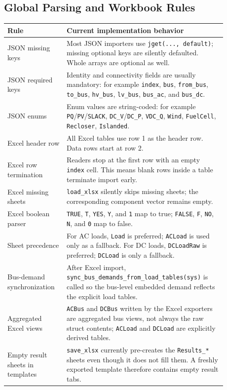 \subsection{Global Parsing and Workbook Rules}

\begin{longtable}{L{0.22\linewidth}L{0.66\linewidth}}
\toprule
Rule & Current implementation behavior \\
\midrule
\endhead
JSON missing keys & Most JSON importers use \texttt{jget(..., default)}; missing optional keys are silently defaulted.  Whole arrays are optional as well. \\
JSON required keys & Identity and connectivity fields are usually mandatory: for example \texttt{index}, \texttt{bus}, \texttt{from\_bus}, \texttt{to\_bus}, \texttt{hv\_bus}, \texttt{lv\_bus}, \texttt{bus\_ac}, and \texttt{bus\_dc}. \\
JSON enums & Enum values are string-coded: for example \texttt{PQ}/\texttt{PV}/\texttt{SLACK}, \texttt{DC\_V}/\texttt{DC\_P}, \texttt{VDC\_Q}, \texttt{Wind}, \texttt{FuelCell}, \texttt{Recloser}, \texttt{Islanded}. \\
Excel header row & All Excel tables use row 1 as the header row.  Data rows start at row 2. \\
Excel row termination & Readers stop at the first row with an empty \texttt{index} cell.  This means blank rows inside a table terminate import early. \\
Excel missing sheets & \texttt{load\_xlsx} silently skips missing sheets; the corresponding component vector remains empty. \\
Excel boolean parser & \texttt{TRUE}, \texttt{T}, \texttt{YES}, \texttt{Y}, and \texttt{1} map to true; \texttt{FALSE}, \texttt{F}, \texttt{NO}, \texttt{N}, and \texttt{0} map to false. \\
Sheet precedence & For AC loads, \texttt{Load} is preferred; \texttt{ACLoad} is used only as a fallback.  For DC loads, \texttt{DCLoadRaw} is preferred; \texttt{DCLoad} is only a fallback. \\
Bus-demand synchronization & After Excel import, \texttt{sync\_bus\_demands\_from\_load\_tables(sys)} is called so the bus-level embedded demand reflects the explicit load tables. \\
Aggregated Excel views & \texttt{ACBus} and \texttt{DCBus} written by the Excel exporters are aggregated bus views, not always the raw struct contents; \texttt{ACLoad} and \texttt{DCLoad} are explicitly derived tables. \\
Empty result sheets in templates & \texttt{save\_xlsx} currently pre-creates the \texttt{Results\_*} sheets even though it does not fill them.  A freshly exported template therefore contains empty result tabs. \\
\bottomrule
\end{longtable}

